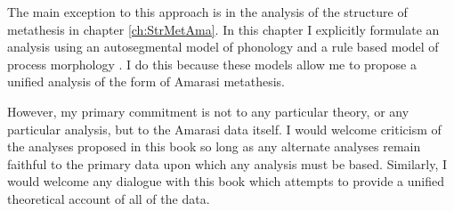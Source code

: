 The main exception to this approach is in the analysis
of the structure of metathesis in chapter \ref{ch:StrMetAma}.
In this chapter I explicitly formulate an analysis
using an autosegmental model of phonology \citep{go76}
and a rule based model of process morphology \citep{ma74,an92}.
I do this because these models allow me to propose a
unified analysis of the form of Amarasi metathesis.

However, my primary commitment is not to any particular theory,
or any particular analysis, but to the Amarasi data itself.
I would welcome criticism of the analyses
proposed in this book so long as any alternate analyses
remain faithful to the primary data upon which any analysis must be based.
Similarly, I would welcome any dialogue with this book which
attempts to provide a unified theoretical account of all of the data.